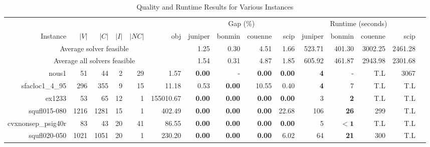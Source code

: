  
\begin{table*}[t] 
\footnotesize 
\caption{Quality and Runtime Results for Various Instances} 
\begin{tabular}{|r|r|r|r|r||r||r|r|r|r||r|r|r|r|r|} 
\hline 
                        &     &       &        &  &   & \multicolumn{4}{c||}{Gap (\%)} &  \multicolumn{4}{c|}{Runtime (seconds)} \\ 
    Instance              & $|V|$& $|C|$& $|I|$& $|NC|$ & obj         & juniper    & bonmin & couenne        & scip            & juniper          & bonmin            & couenne         & scip \\ 
    \hline 
    \hline 
\multicolumn{6}{|c||}{Average solver feasible} & 1.25 & 0.30 & 4.51 & 1.66 & 523.71 & 401.30 & 3002.25 & 2461.28  \\ 
\multicolumn{6}{|c||}{Average all solvers feasible} & 1.54 & 0.31 & 4.87 & 1.85 & 605.92 & 461.87 & 2943.98 & 2301.68  \\ 
\hline 
\hline 
                            nous1 &           51 &           44 &           2 &          29 &              1.57 & \textbf{0.00} &            - & \textbf{0.00} & \textbf{0.00} &   \textbf{4} &                  - &          T.L &         3067 \\ 
                  sfacloc1\_4\_95 &          296 &          355 &           9 &          15 &             11.18 &          0.53 &\textbf{0.00} &         10.55 &          0.40 &   \textbf{4} &                  7 &          T.L &          T.L \\ 
                           ex1233 &           53 &           65 &          12 &           1 &         155010.67 & \textbf{0.00} &\textbf{0.00} & \textbf{0.00} & \textbf{0.00} &            3 &         \textbf{2} &          T.L &          T.L \\ 
                     squfl015-080 &         1216 &         1281 &          15 &           1 &            402.49 & \textbf{0.00} &\textbf{0.00} & \textbf{0.00} &         22.68 &          106 &        \textbf{26} &          299 &          T.L \\ 
               cvxnonsep\_psig40r &           83 &           43 &          20 &          41 &             86.55 & \textbf{0.00} &\textbf{0.00} & \textbf{0.00} & \textbf{0.00} &            5 &         $\bm{< 1}$ &          T.L &          T.L \\ 
                     squfl020-050 &         1021 &         1051 &          20 &           1 &            230.20 & \textbf{0.00} &\textbf{0.00} & \textbf{0.00} &          6.02 &           64 &        \textbf{21} &          300 &          T.L \\ 

\end{tabular}
\end{table*}
